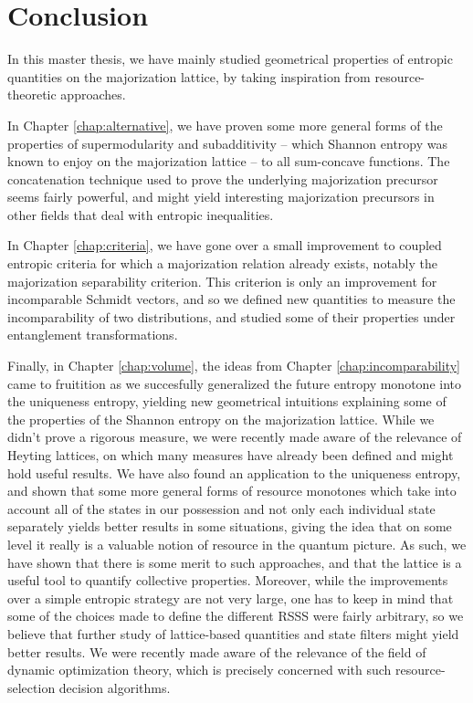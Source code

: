 \chapter{Conclusion}

In this master thesis, we have mainly studied geometrical properties of entropic quantities on the majorization lattice, by taking inspiration from resource-theoretic approaches.

In Chapter \ref{chap:alternative}, we have proven some more general forms of the properties of supermodularity and subadditivity -- which Shannon entropy was known to enjoy on the majorization lattice -- to all sum-concave functions. The concatenation technique used to prove the underlying majorization precursor seems fairly powerful, and might yield interesting majorization precursors in other fields that deal with entropic inequalities.

In Chapter \ref{chap:criteria}, we have gone over a small improvement to coupled entropic criteria for which a majorization relation already exists, notably the majorization separability criterion. This criterion is only an improvement for incomparable Schmidt vectors, and so we defined new quantities to measure the incomparability of two distributions, and studied some of their properties under entanglement transformations.

Finally, in Chapter \ref{chap:volume}, the ideas from Chapter \ref{chap:incomparability} came to fruitition as we succesfully generalized the future entropy monotone into the uniqueness entropy, yielding new geometrical intuitions explaining some of the properties of the Shannon entropy on the majorization lattice. While we didn't prove a rigorous measure, we were recently made aware of the relevance of Heyting lattices, on which many measures have already been defined and might hold useful results. We have also found an application to the uniqueness entropy, and shown that some more general forms of resource monotones which take into account all of the states in our possession and not only each individual state separately yields better results in some situations, giving the idea that on some level it really is a valuable notion of resource in the quantum picture. As such, we have shown that there is some merit to such approaches, and that the lattice is a useful tool to quantify collective properties. Moreover, while the improvements over a simple entropic strategy are not very large, one has to keep in mind that some of the choices made to define the different RSSS were fairly arbitrary, so we believe that further study of lattice-based quantities and state filters might yield better results. We were recently made aware of the relevance of the field of dynamic optimization theory, which is precisely concerned with such resource-selection decision algorithms.

